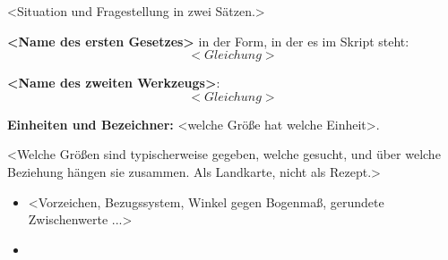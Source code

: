 

<Situation und Fragestellung in zwei Sätzen.>

\begin{werkzeugkasten}[Werkzeuge]
\textbf{<Name des ersten Gesetzes>} in der Form, in der es im Skript steht:
\begin{equation}
  <Gleichung>
\end{equation}

\textbf{<Name des zweiten Werkzeugs>}:
\begin{equation}
  <Gleichung>
\end{equation}

\textbf{Einheiten und Bezeichner:} <welche Größe hat welche Einheit>.
\end{werkzeugkasten}

\begin{werkzeugkasten}
<Welche Größen sind typischerweise gegeben, welche gesucht, und über welche
Beziehung hängen sie zusammen. Als Landkarte, nicht als Rezept.>
\end{werkzeugkasten}

\begin{achtung}
\begin{itemize}
  \item <Vorzeichen, Bezugssystem, Winkel gegen Bogenmaß, gerundete Zwischenwerte ...>
  \item <Einheitenfalle, die zu dieser Aufgabe passt>
\end{itemize}
\end{achtung}
